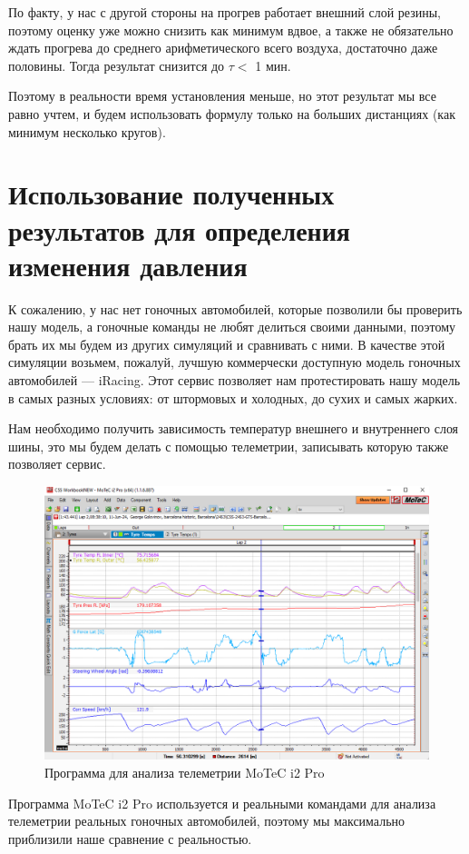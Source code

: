 \documentclass[a4paper,12pt]{report}
\begin{document}
        По факту, у нас с другой стороны на прогрев работает внешний слой резины, поэтому оценку уже можно снизить как минимум вдвое, а также не обязательно ждать прогрева до среднего арифметического всего воздуха, достаточно даже половины. Тогда результат снизится до $\tau < $ 1 мин. 
        
        Поэтому в реальности время установления меньше, но этот результат мы все равно учтем, и будем использовать формулу только на больших дистанциях (как минимум несколько кругов).
    \section{Использование полученных результатов для определения\\ изменения давления}
        К сожалению, у нас нет гоночных автомобилей, которые позволили бы проверить нашу модель, а гоночные команды не любят делиться своими данными, поэтому брать их мы будем из других симуляций и сравнивать с ними. В качестве этой симуляции возьмем, пожалуй, лучшую коммерчески доступную модель гоночных автомобилей --- iRacing. Этот сервис позволяет нам протестировать нашу модель в самых разных условиях: от штормовых и холодных, до сухих и самых жарких.

        Нам необходимо получить зависимость температур внешнего и внутреннего слоя шины, это мы будем делать с помощью телеметрии, записывать которую также позволяет сервис. 
        \begin{figure}[H]
            \centering
            \includegraphics[width=0.7\linewidth]{img/motec_ex.png}
            \caption{Программа для анализа телеметрии MoTeC i2 Pro}
        \end{figure}
        Программа MoTeC i2 Pro используется и реальными командами для анализа телеметрии реальных гоночных автомобилей, поэтому мы максимально приблизили наше сравнение с реальностью.
\end{document}
